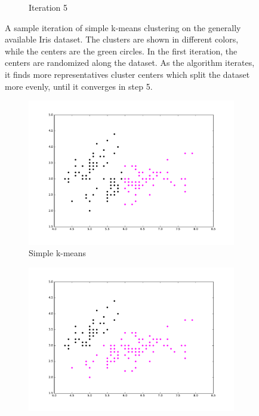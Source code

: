 \begin{figure}[!h]
\begin{subfigure}{0.3\textwidth}
		\caption{Iteration 5}
	\end{subfigure}
  \caption{A sample iteration of simple k-means clustering on the generally available Iris dataset. The clusters are shown in different colors, while the centers are the green circles. In the first iteration, the centers are randomized along the dataset. As the algorithm iterates, it finds more representatives cluster centers which split the dataset more evenly, until it converges in step 5.}
  \label{fig:k-means}
\end{figure}

\begin{figure}[!h]
  \centering
  \begin{subfigure}{.4\textwidth}
    \centering
    \includegraphics[width=\linewidth]{figures/simple_k_means_iris.pdf}
    \caption{Simple k-means}
  \end{subfigure} %
  \begin{subfigure}{0.4\textwidth}
    \centering
    \includegraphics[width=\linewidth]{figures/gaussian_mixture_iris.pdf}

\end{subfigure}
\end{figure}
